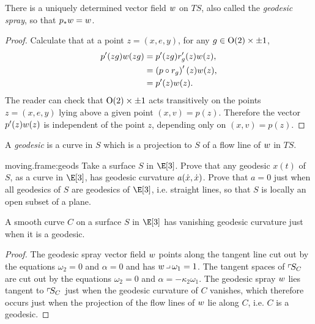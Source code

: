 \begin{proposition}
There is a uniquely determined vector field \(\geodesicVectorField\) on \(TS\), also called the \emph{geodesic spray}, so that \(p_* \geodesicVectorField = \geodesicVectorField\).
\end{proposition}
\begin{proof}
Calculate that at a point \(z=(x,e,y)\), for any \(g \in \Orth{2} \times \pm 1\),
\begin{align*}
p'(zg) \geodesicVectorField(zg)
&=
p'(zg) r_g'(z) \geodesicVectorField(z),
\\
&=
\pr{p \circ r_g}'(z) \geodesicVectorField(z), 
\\
&=
p'(z) \geodesicVectorField(z).
\end{align*}
The reader can check that \(\Orth{2} \times \pm 1\) acts transitively on the points \(z=(x,e,y)\) lying above a given point \((x,v)=p(z)\).
Therefore the vector \(p'(z) \geodesicVectorField(z)\) is independent of the point \(z\), depending only on \((x,v)=p(z)\). 
\end{proof}

A \emph{geodesic}%
is a curve in \(S\) which is a projection to \(S\) of a flow line of \(\geodesicVectorField\) in \(TS\).


\begin{problem}{moving.frame:geods}
Take a surface \(S\) in \(\E[3]\).
Prove that any geodesic \(x(t)\) of \(S\), as a curve in \(\E[3]\), has geodesic curvature \(a\of{\dot{x},\dot{x}}\).
Prove that \(a=0\) just when all geodesics of \(S\) are geodesics of \(\E[3]\), i.e. straight lines, so that \(S\) is locally an open subset of a plane.
\end{problem}


\begin{lemma}
A smooth curve \(C\) on a surface \(S\) in \(\E[3]\) has vanishing geodesic curvature just when it is a geodesic.
\end{lemma}
\begin{proof}
The geodesic spray vector field \(\geodesicVectorField\) points along the tangent line cut out by the equations \(\omega_2=0\) and \(\alpha=0\) and has \(\geodesicVectorField \hook \omega_1=1\).
The tangent spaces of \(\adaptedFrameBundle{C}{S}\) are cut out by the equations \(\omega_2=0\) and \(\alpha=-\kappa_2 \omega_1\).
The geodesic spray \(\geodesicVectorField\) lies tangent to \(\adaptedFrameBundle{C}{S}\) just when the geodesic curvature of \(C\) vanishes, which therefore occurs just when the projection of the flow lines of \(\geodesicVectorField\) lie along \(C\), i.e. \(C\) is a geodesic.
\end{proof}


